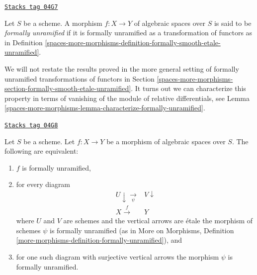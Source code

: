 \begin{definition}
\label{spaces-more-morphisms-definition-formally-unramified}
\href{https://stacks.math.columbia.edu/tag/04G7}{\texttt{Stacks tag 04G7}}

Let $S$ be a scheme. A morphism $f : X \to Y$ of algebraic spaces over $S$
is said to be {\it formally unramified} if it is formally unramified as a
transformation of functors as in
Definition \ref{spaces-more-morphisms-definition-formally-smooth-etale-unramified}.
\end{definition}

We will not restate the results proved in the more general setting of
formally unramified transformations of functors in
Section \ref{spaces-more-morphisms-section-formally-smooth-etale-unramified}.
It turns out we can characterize this property in terms of vanishing of the
module of relative differentials, see
Lemma \ref{spaces-more-morphisms-lemma-characterize-formally-unramified}.

\begin{lemma}
\label{spaces-more-morphisms-lemma-formally-unramified}
\href{https://stacks.math.columbia.edu/tag/04G8}{\texttt{Stacks tag 04G8}}

Let $S$ be a scheme. Let $f : X \to Y$ be a morphism of algebraic spaces over
$S$. The following are equivalent:
\begin{enumerate}
\item $f$ is formally unramified,
\item for every diagram
$$
\begin{array}{cc}U \downarrow\underset{\psi}{\longrightarrow} & V \downarrow \\ X \overset{f}{\longrightarrow} & Y\end{array}
$$
where $U$ and $V$ are schemes and the vertical arrows are \'etale
the morphism of schemes $\psi$ is formally unramified (as in
More on Morphisms,
Definition \ref{more-morphisms-definition-formally-unramified}), and
\item for one such diagram with surjective vertical arrows the morphism
$\psi$ is formally unramified.
\end{enumerate}
\end{lemma}

